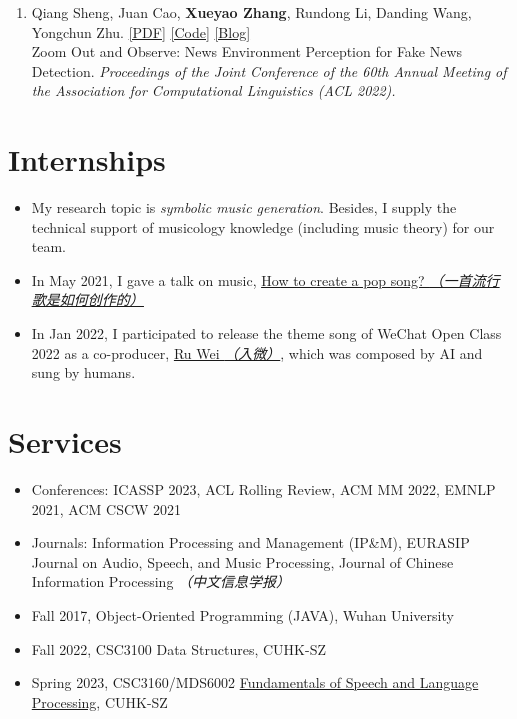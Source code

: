 \documentclass{resume}
\begin{document}
\begin{enumerate}
  \item Qiang Sheng, Juan Cao, \textbf{Xueyao Zhang}, Rundong Li, Danding Wang, Yongchun Zhu. \href{https://aclanthology.org/2022.acl-long.311.pdf}{[PDF]} \href{https://github.com/ICTMCG/News-Environment-Perception}{[Code]} \href{https://mp.weixin.qq.com/s/aTFeuCYIpSoazeRi52jqew}{[Blog]}\\Zoom Out and Observe: News Environment Perception for Fake News Detection. \textit{Proceedings of the Joint Conference of the 60th Annual Meeting of the Association for Computational Linguistics (ACL 2022).}
\end{enumerate}


\section{Internships}
{\small {}
}
\begin{itemize}
  \item My research topic is \textit{symbolic music generation}. Besides, I supply the technical support of musicology knowledge (including music theory) for our team. 
  \item In May 2021, I gave a talk on music, \href{https://www.zhangxueyao.com/data/wcpr-pop-music.pdf}{\underline{How to create a pop song? \textit{（一首流行歌是如何创作的）}}}
  \item In Jan 2022, I participated to release the theme song of WeChat Open Class 2022 as a co-producer, \href{https://y.qq.com/n/ryqq/songDetail/000xeNJ53orPG2}{Ru Wei \textit{（入微）}}, which was composed by AI and sung by humans.
\end{itemize}

\section{Services}
\begin{itemize}
  \item Conferences: ICASSP 2023, ACL Rolling Review, ACM MM 2022, EMNLP 2021, ACM CSCW 2021
  \item Journals: Information Processing and Management (IP\&M), EURASIP Journal on Audio, Speech, and Music Processing, Journal of Chinese Information Processing \textit{（中文信息学报）}
\end{itemize}
\begin{itemize}
  \item Fall 2017, Object-Oriented Programming (JAVA), Wuhan University
  \item Fall 2022, CSC3100 Data Structures, CUHK-SZ
  \item Spring 2023, CSC3160/MDS6002 \href{https://drwuz.com/CSC3160/index.html}{Fundamentals of Speech and Language Processing}, CUHK-SZ
\end{itemize}
\end{document}
